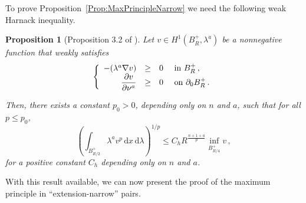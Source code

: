 \documentclass[12pt,reqno]{amsart}
\newtheorem{proposition}[theorem]{Proposition}
\theoremstyle{definition}
\theoremstyle{remark}
\renewcommand{\d}{\,\mathrm{d}} %
\newcommand{\dx}{\,\mathrm{d}x} %
\newcommand\beqc[1]{\left\{\begin{array}{#1}}
\newcommand\eeqc{\end{array} \right.}
\def\PDEsystem{rcll}
\let\div\relax
\DeclareMathOperator{\div}{div}
\numberwithin{equation}{section}
\begin{document}
To prove Proposition~\ref{Prop:MaxPrincipleNarrow} we need the following weak Harnack inequality.

\begin{proposition}[Proposition 3.2 of \cite{TanXiong}]
	\label{Prop:WeakHarnack}
	Let $v \in H^1(B_R^+, \lambda^a)$ be a nonnegative function that weakly satisfies 
	$$
	\beqc{\PDEsystem}
	-\div(\lambda^a \nabla v) &\geq& 0 & \textrm{ in } B_R^+\,, \\
	\dfrac{\partial v}{\partial \nu^a} &\geq & 0 & \textrm{ on }  \partial_0 B_R^+\,.
	\eeqc
	$$
	
	Then, there exists a constant $p_0 > 0$, depending only on $n$ and $a$, such that for all $p\leq p_0$,
	\begin{equation}
	\label{Eq:WeakHarnack}
	\left( \int_{B_{R/2}^+} \lambda^a v^p \dx \d \lambda \right )^{1/p} \leq C_h R^{\frac{n+1+a}{p} } \inf_{B^+_{R/4}} v\,,
	\end{equation}
	for a positive constant $C_h$ depending only on $n$ and $a$.
\end{proposition}

With this result available, we can now present the proof of the maximum principle in ``extension-narrow'' pairs.
\end{document}
